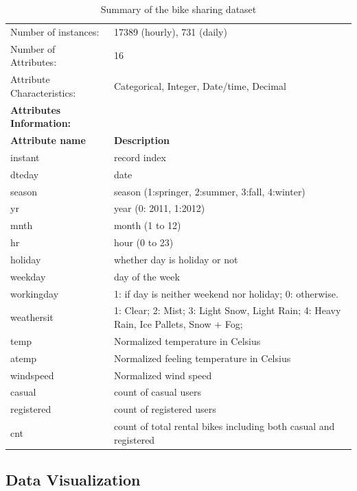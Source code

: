 \documentclass[12pt]{article}
\begin{document}
	\begin{table}[H]
		\begin{tabular}{| p{5cm} | p{11cm} |} \hline
			Number of instances: & 17389 (hourly), 731 (daily)\\
			Number of Attributes: & 16\\ 
			Attribute Characteristics: &  Categorical, Integer,
			Date/time, Decimal\\
			\hline \hline
			\textbf{Attributes Information:} &\\ \hline
			\textbf{Attribute name } & \textbf{Description}\\ \hline
			instant   & record index\\ \hline
			dteday    & date\\ \hline
			season   & season (1:springer, 2:summer, 3:fall, 4:winter)\\ \hline
			yr    &  year (0: 2011, 1:2012)\\ \hline
			mnth &   month (1 to 12)\\ \hline
			hr & hour (0 to 23) \\ \hline
			holiday   & whether day is holiday or not \\ \hline
			weekday   &  day of the week \\ \hline
			workingday   & 1: if day is neither weekend nor holiday; 0: otherwise.\\ \hline
			weathersit   & 1: Clear; 2: Mist; 3: Light Snow, Light Rain; 4: Heavy Rain, Ice Pallets, Snow + Fog;\\ \hline
			temp   & Normalized temperature in Celsius \\ \hline
			atemp    & Normalized feeling temperature in Celsius \\ \hline
			windspeed   & Normalized wind speed \\ \hline
			casual   & count of casual users\\ \hline
			registered   & count of registered users\\ \hline
			cnt   & count of total rental bikes including both casual and registered \\ \hline
		\end{tabular}
		\caption{Summary of the bike sharing dataset}
			\label{table:dataset}
	\end{table}
	\subsection{Data Visualization}
	\label{sec:visual}
	
\end{document}
